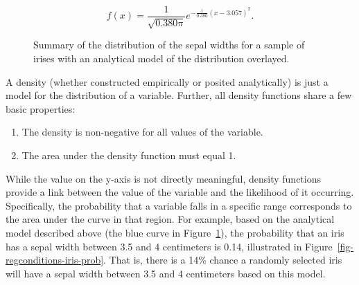 \documentclass[
  letterpaper,
  DIV=11,
  numbers=noendperiod]{scrreprt}
\providecommand{\tightlist}{%
  \setlength{\itemsep}{0pt}\setlength{\parskip}{0pt}}\usepackage{longtable,booktabs,array}
\theoremstyle{definition}
\theoremstyle{definition}
\theoremstyle{plain}
\theoremstyle{remark}
\begin{document}
\[f(x) = \frac{1}{\sqrt{0.380\pi}} e^{-\frac{1}{0.380}(x - 3.057)^2}.\]

\begin{figure}


\caption{\label{fig-regconditions-iris-normal}Summary of the
distribution of the sepal widths for a sample of irises with an
analytical model of the distribution overlayed.}

\end{figure}%

A density (whether constructed empirically or posited analytically) is
just a model for the distribution of a variable. Further, all density
functions share a few basic properties:

\begin{enumerate}
\def\labelenumi{\arabic{enumi}.}
\tightlist
\item
  The density is non-negative for all values of the variable.
\item
  The area under the density function must equal 1.
\end{enumerate}

While the value on the y-axis is not directly meaningful, density
functions provide a link between the value of the variable and the
likelihood of it occurring. Specifically, the probability that a
variable falls in a specific range corresponds to the area under the
curve in that region. For example, based on the analytical model
described above (the blue curve in
Figure~\ref{fig-regconditions-iris-normal}), the probability that an
iris has a sepal width between 3.5 and 4 centimeters is 0.14,
illustrated in Figure~\ref{fig-regconditions-iris-prob}. That is, there
is a 14\% chance a randomly selected iris will have a sepal width
between 3.5 and 4 centimeters based on this model.
\end{document}
